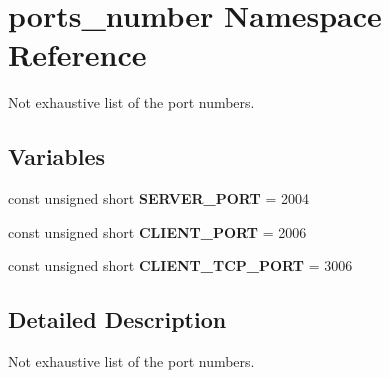 \hypertarget{namespaceports__number}{}\section{ports\+\_\+number Namespace Reference}
\label{namespaceports__number}


Not exhaustive list of the port numbers.  


\subsection*{Variables}
\begin{DoxyCompactItemize}
\item 
\mbox{\label{namespaceports__number_a166365e051e5ec19bfd4cc3b0b0ecde7}} 
const unsigned short {\bfseries S\+E\+R\+V\+E\+R\+\_\+\+P\+O\+RT} = 2004
\item 
\mbox{\label{namespaceports__number_a70a7f4336aff3a50645d8883bb1d22b8}} 
const unsigned short {\bfseries C\+L\+I\+E\+N\+T\+\_\+\+P\+O\+RT} = 2006
\item 
\mbox{\label{namespaceports__number_a752172982b932f36cfd636345a7b7a45}} 
const unsigned short {\bfseries C\+L\+I\+E\+N\+T\+\_\+\+T\+C\+P\+\_\+\+P\+O\+RT} = 3006
\end{DoxyCompactItemize}


\subsection{Detailed Description}
Not exhaustive list of the port numbers. 